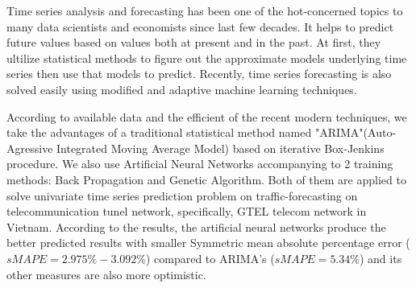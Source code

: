 


\begin{abstractsen}       %

Time series analysis and forecasting has been one of the hot-concerned topics to many data scientists and economists since last few decades. It helps to predict future values based on values both at present and in the past. At first, they ultilize statistical methods to figure out the approximate models underlying time series then use that models to predict. Recently, time series forecasting is also solved easily using modified and adaptive machine learning techniques.

According to available data and the efficient of the recent modern techniques, we take the advantages of a traditional statistical method named "ARIMA"(Auto-Agressive Integrated Moving Average Model) based on iterative Box-Jenkins procedure. We also use Artificial Neural Networks accompanying to 2 training methods: Back Propagation  and Genetic Algorithm. Both of them are applied to solve univariate time series prediction problem on traffic-forecasting on telecommunication tunel network, specifically, GTEL telecom network in Vietnam. According to the results, the artificial neural networks produce the better predicted results with smaller Symmetric mean absolute percentage error ($sMAPE = 2.975\%-3.092\%$) compared to ARIMA's ($sMAPE=5.34\%$) and its other measures are also more optimistic.
\end{abstractsen}

